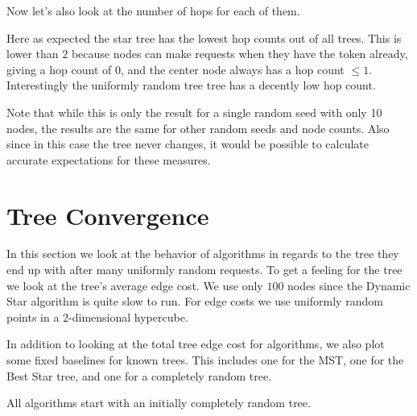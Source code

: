 \documentclass[a4paper, oneside]{discothesis}
\begin{document}
Now let's also look at the number of hops for each of them.


Here as expected the star tree has the lowest hop counts out of all trees. This is lower than $2$ because nodes can make requests when they have the token already, giving a hop count of $0$, and the center node always has a hop count $\leq 1$. Interestingly the uniformly random tree tree has a decently low hop count.

Note that while this is only the result for a single random seed with only 10 nodes, the results are the same for other random seeds and node counts. Also since in this case the tree never changes, it would be possible to calculate accurate expectations for these measures.

\section{Tree Convergence}

In this section we look at the behavior of algorithms in regards to the tree they end up with after many uniformly random requests. To get a feeling for the tree we look at the tree's average edge cost. We use only $100$ nodes since the Dynamic Star algorithm is quite slow to run. For edge costs we use uniformly random points in a 2-dimensional hypercube.

In addition to looking at the total tree edge cost for algorithms, we also plot some fixed baselines for known trees. This includes one for the MST, one for the Best Star tree, and one for a completely random tree.

All algorithms start with an initially completely random tree.
\end{document}
